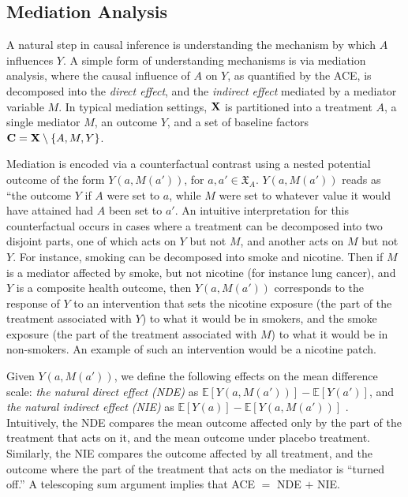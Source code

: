 \documentclass[letterpaper]{article} %
\newcommand{\citep}{\cite}
\begin{document}
\subsection{Mediation Analysis}
\label{sec:mediation}

A natural step in causal inference is understanding the mechanism by which $A$ influences $Y$. A simple form of understanding mechanisms is via mediation analysis, where the causal influence of $A$ on $Y$, as quantified by the ACE, is decomposed into the \emph{direct effect}, and the \emph{indirect effect} mediated by a mediator variable $M$.  
In typical mediation settings, ${\bf X}$ is partitioned into a treatment $A$, a single mediator $M$, an outcome $Y$, and a set of baseline factors ${\bf C} = {\bf X} \setminus \{ A, M, Y \}$.

Mediation is encoded via a counterfactual contrast using a nested potential outcome of the form $Y(a,M(a'))$, for $a,a' \in {\mathfrak X}_A$.  $Y(a,M(a'))$ reads as
``the outcome $Y$ if $A$ were set to $a$, while $M$ were set to whatever value it would have attained had $A$ been set to $a'$.  An intuitive interpretation for this counterfactual occurs in cases where a treatment can be decomposed into two disjoint parts, one of which acts on $Y$ but not $M$, and another acts on $M$ but not $Y$.  For instance, smoking can be decomposed into smoke and nicotine.  Then if $M$ is a mediator affected by smoke, but not nicotine (for instance lung cancer), and $Y$ is a composite health outcome, then $Y(a,M(a'))$ corresponds to the response of $Y$ to an intervention that sets the nicotine exposure (the part of the treatment associated with $Y$) to what it would be in smokers, and the smoke exposure (the part of the treatment associated with $M$) to what it would be in non-smokers. An example of such an intervention would be a nicotine patch.

Given $Y(a,M(a'))$, we define the following effects on the mean difference scale: \emph{the natural direct effect (NDE)} as $\mathbb{E}[Y(a,M(a'))] - \mathbb{E}[Y(a')]$, and \emph{the natural indirect effect (NIE)} as $\mathbb{E}[Y(a)] - \mathbb{E}[Y(a,M(a'))]$ \citep{robins92effects}.  Intuitively, the NDE compares the mean outcome affected only by the part of the treatment that acts on it, and the mean outcome under placebo treatment.  Similarly, the NIE compares the outcome affected by all treatment, and the outcome where the part of the treatment that acts on the mediator is ``turned off.''  A telescoping sum argument implies that ACE $=$ NDE $+$ NIE.
\end{document}
